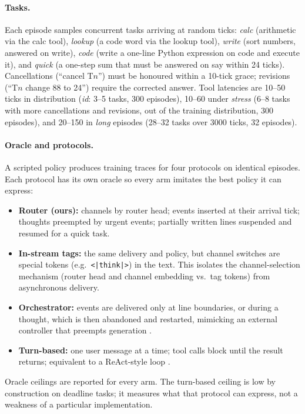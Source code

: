 \documentclass[10pt]{article}
\begin{document}
\paragraph{Tasks.} Each episode samples concurrent tasks arriving at random ticks: \emph{calc} (arithmetic via the calc tool), \emph{lookup} (a code word via the lookup tool), \emph{write} (sort numbers, answered on write), \emph{code} (write a one-line Python expression on code and execute it), and \emph{quick} (a one-step sum that must be answered on say within 24 ticks). Cancellations (``cancel T$n$'') must be honoured within a 10-tick grace; revisions (``T$n$ change 88 to 24'') require the corrected answer. Tool latencies are 10--50 ticks in distribution (\emph{id}: 3--5 tasks, 300 episodes), 10--60 under \emph{stress} (6--8 tasks with more cancellations and revisions, out of the training distribution, 300 episodes), and 20--150 in \emph{long} episodes (28--32 tasks over 3000 ticks, 32 episodes).

\paragraph{Oracle and protocols.} A scripted policy produces training traces for four protocols on identical episodes. Each protocol has its own oracle so every arm imitates the best policy it can express:
\begin{itemize}\itemsep0pt
\item \textbf{Router (ours):} channels by router head; events inserted at their arrival tick; thoughts preempted by urgent events; partially written lines suspended and resumed for a quick task.
\item \textbf{In-stream tags:} the same delivery and policy, but channel switches are special tokens (e.g.\ \texttt{<|think|>}) in the text. This isolates the channel-selection mechanism (router head and channel embedding vs.\ tag tokens) from asynchronous delivery.
\item \textbf{Orchestrator:} events are delivered only at line boundaries, or during a thought, which is then abandoned and restarted, mimicking an external controller that preempts generation \citep{li2026never}.
\item \textbf{Turn-based:} one user message at a time; tool calls block until the result returns; equivalent to a ReAct-style loop \citep{yao2022react}.
\end{itemize}
Oracle ceilings are reported for every arm. The turn-based ceiling is low by construction on deadline tasks; it measures what that protocol can express, not a weakness of a particular implementation.
\end{document}
